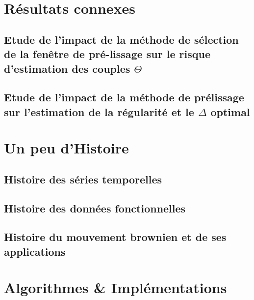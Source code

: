 \chapter{Résultats connexes}

\section{Etude de l'impact de la méthode de sélection de la fenêtre de pré-lissage sur le risque d'estimation des couples $\Theta$}




\section{Etude de l'impact de la méthode de prélissage sur l'estimation de la régularité et le $\Delta$ optimal}
\label{annexe:prelissage_impact}


\chapter{Un peu d'Histoire}
\label{annexe:histoire}
\section{ Histoire des séries temporelles }

\pagebreak
\section{ Histoire des données fonctionnelles }

\pagebreak
\section{Histoire du mouvement brownien et de ses applications}



\pagebreak

% 

\chapter{Algorithmes \& Implémentations}

